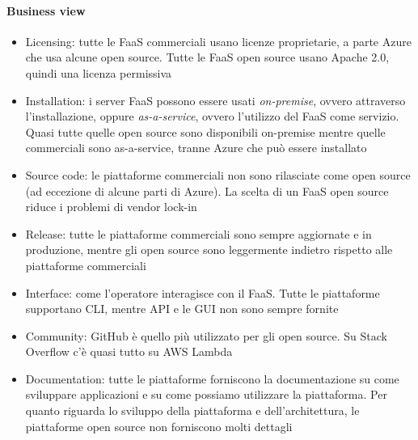 \paragraph{Business view}
\begin{itemize}
    \item Licensing: tutte le FaaS commerciali usano licenze proprietarie, a parte Azure che usa alcune open source. Tutte le FaaS open source usano Apache 2.0, quindi una licenza permissiva
    \item Installation: i server FaaS possono essere usati \textit{on-premise}, ovvero attraverso l’installazione, oppure \textit{as-a-service}, ovvero l’utilizzo del FaaS come servizio. Quasi tutte quelle open source sono disponibili on-premise mentre quelle commerciali sono as-a-service, tranne Azure che può essere installato
    \item Source code: le piattaforme commerciali non sono rilasciate come open source (ad eccezione di alcune parti di Azure). La scelta di un FaaS open source riduce i problemi di vendor lock-in
    \item Release: tutte le piattaforme commerciali sono sempre aggiornate e in produzione, mentre gli open source sono leggermente indietro rispetto alle piattaforme commerciali
    \item Interface: come l’operatore interagisce con il FaaS. Tutte le piattaforme supportano CLI, mentre API e le GUI non sono sempre fornite
    \item Community: GitHub è quello più utilizzato per gli open source. Su Stack Overflow c'è quasi tutto su AWS Lambda
    \item Documentation: tutte le piattaforme forniscono la documentazione su come sviluppare applicazioni e su come possiamo utilizzare la piattaforma. Per quanto riguarda lo sviluppo della piattaforma e dell’architettura, le piattaforme open source non forniscono molti dettagli
\end{itemize}


